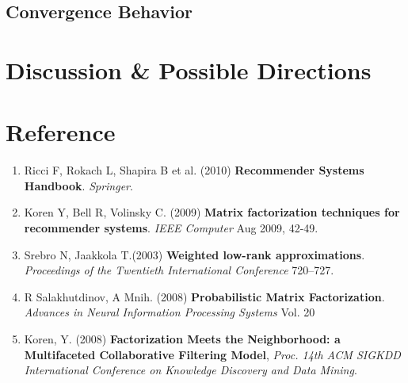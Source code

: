 \documentclass[11pt]{article}
\theoremstyle{definition}
\begin{document}
\subsection{\textbf{Convergence Behavior}}


\section{\textbf{Discussion \& Possible Directions}}


\newpage
\section*{\textbf{Reference}}
\begin{enumerate}
\item \label{ref:handbook}
Ricci F, Rokach L, Shapira B et al. (2010) \textbf{Recommender Systems Handbook}. \textit{Springer}. 
\item \label{ref:MFieee}
Koren Y, Bell R, Volinsky C. (2009) \textbf{Matrix factorization techniques for recommender systems}. \textit{IEEE Computer} Aug 2009, 42-49. 
\item \label{ref:WLA}
Srebro N,  Jaakkola T.(2003) \textbf{Weighted low-rank approximations}. \textit{Proceedings of the Twentieth International Conference} 720–727.
\item \label{ref:PMF}
R Salakhutdinov, A Mnih. (2008) \textbf{Probabilistic Matrix Factorization}. \textit{Advances in Neural Information Processing Systems} Vol. 20

\item \label{ref:implicit}
Koren, Y. (2008) \textbf{Factorization Meets the Neighborhood: a Multifaceted Collaborative Filtering Model}, \textit{Proc. 14th ACM SIGKDD International Conference on Knowledge Discovery and
Data Mining}.

\end{enumerate}
\end{document}
